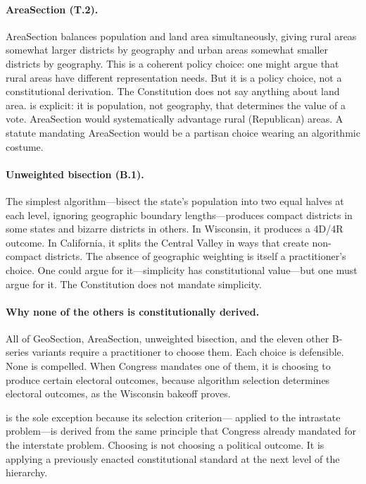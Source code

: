 \paragraph{AreaSection (T.2).}
AreaSection \citep{b9paper} balances population and land area simultaneously,
giving rural areas somewhat larger districts by geography and urban areas
somewhat smaller districts by geography.
This is a coherent policy choice: one might argue that rural areas have
different representation needs.
But it is a policy choice, not a constitutional derivation.
The Constitution does not say anything about land area.
\wesberry{} is explicit: it is population, not geography, that determines
the value of a vote.
AreaSection would systematically advantage rural (Republican) areas.
A statute mandating AreaSection would be a partisan choice wearing an
algorithmic costume.

\paragraph{Unweighted bisection (B.1).}
The simplest algorithm---bisect the state's population into two equal halves
at each level, ignoring geographic boundary lengths---produces compact
districts in some states and bizarre districts in others.
In Wisconsin, it produces a 4D/4R outcome.
In California, it splits the Central Valley in ways that create non-compact
districts.
The absence of geographic weighting is itself a practitioner's choice.
One could argue for it---simplicity has constitutional value---but one must
argue for it.
The Constitution does not mandate simplicity.

\paragraph{Why none of the others is constitutionally derived.}
All of GeoSection, AreaSection, unweighted bisection, and the eleven other
B-series variants require a practitioner to choose them.
Each choice is defensible.
None is compelled.
When Congress mandates one of them, it is choosing to produce certain
electoral outcomes, because algorithm selection determines electoral outcomes,
as the Wisconsin bakeoff proves.

\ar{} is the sole exception because its selection criterion---\hh{} applied
to the intrastate problem---is derived from the same principle that Congress
already mandated for the interstate problem.
Choosing \ar{} is not choosing a political outcome.
It is applying a previously enacted constitutional standard at the next level
of the hierarchy.

